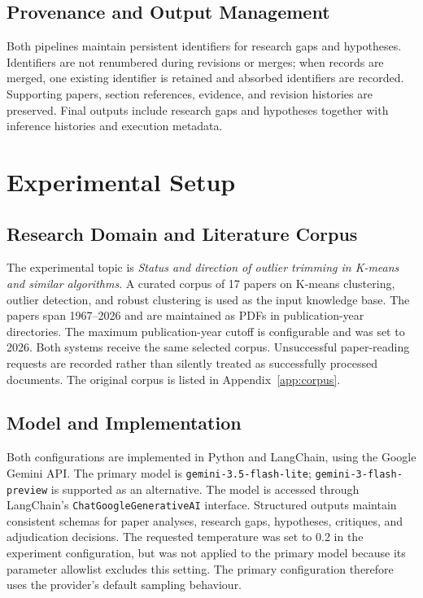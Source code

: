 \documentclass[sigconf,review,anonymous=false]{acmart}
\begin{document}
\subsection{Provenance and Output Management}
Both pipelines maintain persistent identifiers for research gaps and hypotheses. Identifiers are not renumbered during revisions or merges; when records are merged, one existing identifier is retained and absorbed identifiers are recorded. Supporting papers, section references, evidence, and revision histories are preserved. Final outputs include research gaps and hypotheses together with inference histories and execution metadata.

\section{Experimental Setup}
\subsection{Research Domain and Literature Corpus}
The experimental topic is \emph{Status and direction of outlier trimming in K-means and similar algorithms}. A curated corpus of 17 papers on K-means clustering, outlier detection, and robust clustering is used as the input knowledge base. The papers span 1967--2026 and are maintained as PDFs in publication-year directories. The maximum publication-year cutoff is configurable and was set to 2026. Both systems receive the same selected corpus. Unsuccessful paper-reading requests are recorded rather than silently treated as successfully processed documents. The original corpus is listed in Appendix~\ref{app:corpus}.

\subsection{Model and Implementation}
Both configurations are implemented in Python and LangChain, using the Google Gemini API. The primary model is \texttt{gemini-3.5-flash-lite}; \texttt{gemini-3-flash-preview} is supported as an alternative. The model is accessed through LangChain's \texttt{ChatGoogleGenerativeAI} interface. Structured outputs maintain consistent schemas for paper analyses, research gaps, hypotheses, critiques, and adjudication decisions. The requested temperature was set to 0.2 in the experiment configuration, but was not applied to the primary model because its parameter allowlist excludes this setting. The primary configuration therefore uses the provider's default sampling behaviour.
\end{document}
